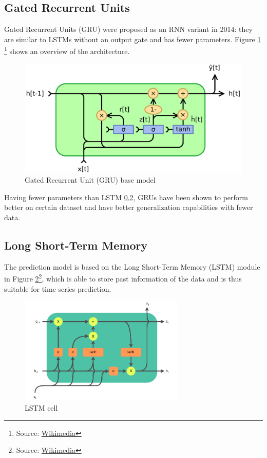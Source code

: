 \documentclass[12pt]{article}
\begin{document}
\subsection{Gated Recurrent Units}
\label{sec:gru}
Gated Recurrent Units (GRU) \cite{cho2014learning} were proposed as an RNN variant in 2014: they are similar to LSTMs without an output gate and has fewer parameters. Figure \ref{fig:gru} \footnote{Source: \href{https://en.wikipedia.org/wiki/Gated_recurrent_unit}{Wikimedia}} shows an overview of the architecture.
\begin{figure}[h!]
    \centering
    \includegraphics[width=0.7\linewidth]{images/Gated_Recurrent_Unit,_base_type.pdf}
    \caption{Gated Recurrent Unit (GRU) base model}
    \label{fig:gru}
\end{figure}
Having fewer parameters than LSTM \ref{sec:lstm}, GRUs have been shown to perform better on certain dataset and have better generalization capabilities with fewer data.

\subsection{Long Short-Term Memory}
\label{sec:lstm}
The prediction model is based on the Long Short-Term Memory (LSTM) \cite{hochreiter1997long} module in Figure \ref{fig:LSTM}\footnote{Source: \href{https://commons.wikimedia.org/wiki/File:LSTM_cell.svg}{Wikimedia}}, which is able to store past information of the data and is thus suitable for time series prediction.

\begin{figure}[h!]
    \centering
    \includegraphics[width=0.7\textwidth]{images/LSTM_cell.pdf}
    \caption{LSTM cell}
    \label{fig:LSTM}
\end{figure}
\end{document}
